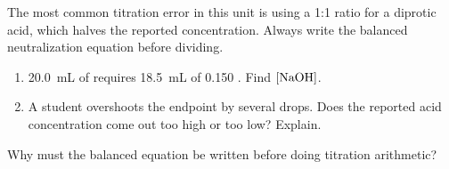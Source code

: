 \documentclass{apchem-notes}
\begin{document}
\begin{apctrap}
The most common titration error in this unit is using a 1:1 ratio for a
diprotic acid, which halves the reported concentration. Always write the
balanced neutralization equation before dividing.
\end{apctrap}


\begin{enumerate}[leftmargin=*,itemsep=0.4em]
  \item \SI{20.0}{\milli\liter} of  requires
        \SI{18.5}{\milli\liter} of \SI{0.150}{\Molar} . Find
        $[\ce{NaOH}]$. \workspace[2.2cm]
  \item A student overshoots the endpoint by several drops. Does the
        reported acid concentration come out too high or too low? Explain.
\end{enumerate}

\begin{exitticket}
Why must the balanced equation be written before doing titration
arithmetic? 
\end{exitticket}
\end{document}
